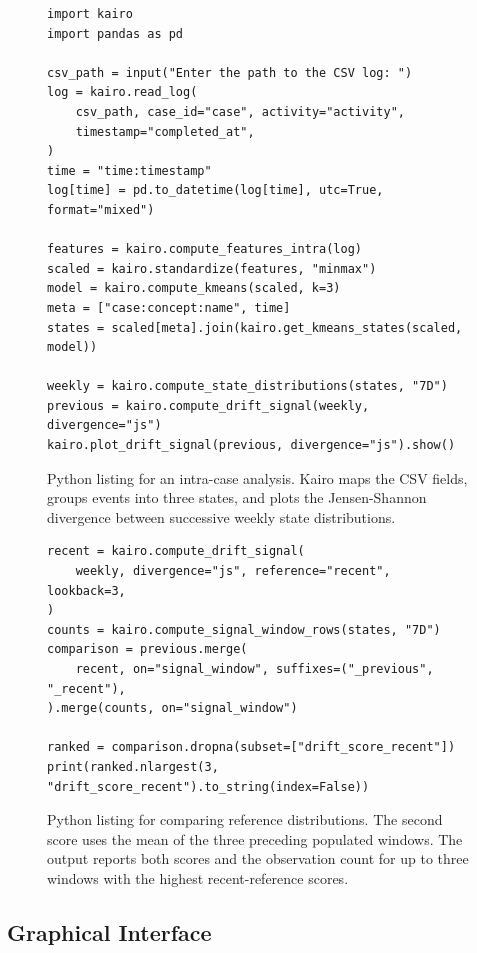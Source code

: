 \begin{figure}[!t]
\begin{lstlisting}[style=kairo-python]
import kairo
import pandas as pd

csv_path = input("Enter the path to the CSV log: ")
log = kairo.read_log(
    csv_path, case_id="case", activity="activity",
    timestamp="completed_at",
)
time = "time:timestamp"
log[time] = pd.to_datetime(log[time], utc=True, format="mixed")

features = kairo.compute_features_intra(log)
scaled = kairo.standardize(features, "minmax")
model = kairo.compute_kmeans(scaled, k=3)
meta = ["case:concept:name", time]
states = scaled[meta].join(kairo.get_kmeans_states(scaled, model))

weekly = kairo.compute_state_distributions(states, "7D")
previous = kairo.compute_drift_signal(weekly, divergence="js")
kairo.plot_drift_signal(previous, divergence="js").show()
\end{lstlisting}
\caption{Python listing for an intra-case analysis. Kairo maps the CSV fields, groups events into three states, and plots the Jensen-Shannon divergence between successive weekly state distributions.}
\label{fig:implementation-python-basic}
\end{figure}

\begin{figure}[!t]
\begin{lstlisting}[style=kairo-python]
recent = kairo.compute_drift_signal(
    weekly, divergence="js", reference="recent", lookback=3,
)
counts = kairo.compute_signal_window_rows(states, "7D")
comparison = previous.merge(
    recent, on="signal_window", suffixes=("_previous", "_recent"),
).merge(counts, on="signal_window")

ranked = comparison.dropna(subset=["drift_score_recent"])
print(ranked.nlargest(3, "drift_score_recent").to_string(index=False))
\end{lstlisting}
\caption{Python listing for comparing reference distributions. The second score uses the mean of the three preceding populated windows. The output reports both scores and the observation count for up to three windows with the highest recent-reference scores.}
\label{fig:implementation-python-review}
\end{figure}

\filbreak
\subsection{Graphical Interface}
\label{sec:implementation-dashboard}

